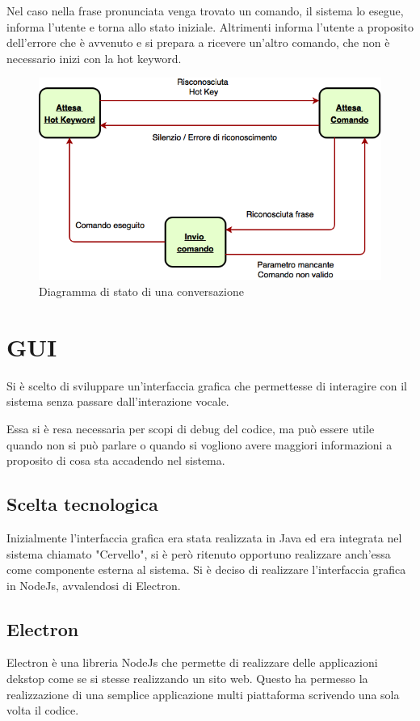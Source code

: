 \documentclass[twoside]{supsistudent}
\begin{document}
Nel caso nella frase pronunciata venga trovato un comando, il sistema lo esegue, informa l'utente e torna allo stato iniziale.
Altrimenti informa l'utente a proposito dell'errore che è avvenuto e si prepara a ricevere un'altro comando, che non è necessario inizi con la hot keyword.
\begin{figure}[H]
\centering
\includegraphics[width=\textwidth]{Conversation}
\caption{Diagramma di stato di una conversazione}
\label{fig:pose}
\end{figure}
\chapter{GUI}
Si è scelto di sviluppare un'interfaccia grafica che permettesse di interagire con il sistema senza passare dall'interazione vocale.

Essa si è resa necessaria per scopi di debug del codice, ma può essere utile quando non si può parlare o quando si vogliono avere maggiori informazioni a proposito di cosa sta accadendo nel sistema.
\section{Scelta tecnologica}
Inizialmente l'interfaccia grafica era stata realizzata in Java ed era integrata nel sistema chiamato "Cervello", si è però ritenuto opportuno realizzare anch'essa come componente esterna al sistema.
Si è deciso di realizzare l'interfaccia grafica in NodeJs, avvalendosi di Electron. \cite{electron}
\section{Electron}
Electron è una libreria NodeJs che permette di realizzare delle applicazioni dekstop come se si stesse realizzando un sito web. Questo ha permesso la realizzazione di una semplice applicazione multi piattaforma scrivendo una sola volta il codice.
\end{document}
